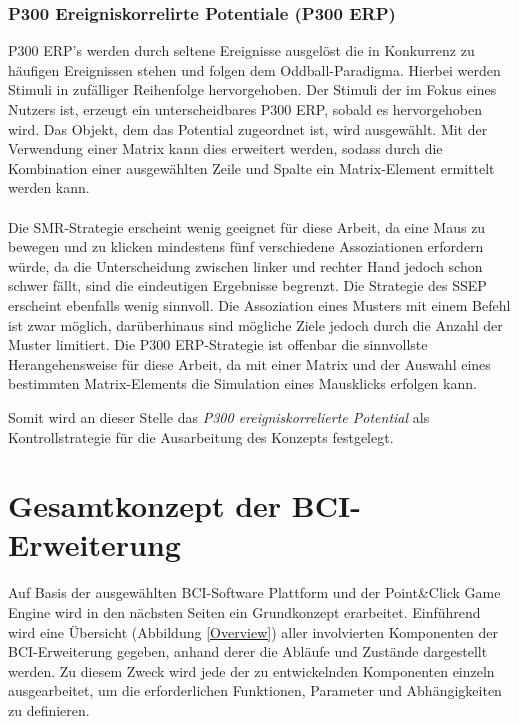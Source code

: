 \subsubsection{P300 Ereigniskorrelirte Potentiale (\acs{P300 ERP})}
\acs{P300 ERP}'s werden durch seltene Ereignisse ausgelöst die in Konkurrenz zu häufigen Ereignissen stehen und folgen dem Oddball-Paradigma.
Hierbei werden Stimuli in zufälliger Reihenfolge hervorgehoben. 
Der Stimuli der im Fokus eines Nutzers ist, erzeugt ein unterscheidbares \acs{P300 ERP}, sobald es hervorgehoben wird.
Das Objekt, dem das Potential zugeordnet ist, wird ausgewählt.
Mit der Verwendung einer Matrix \cite{FarwellDonchin1988} kann dies erweitert werden, sodass durch die Kombination einer ausgewählten Zeile und Spalte ein Matrix-Element ermittelt werden kann.\\ \\





Die \acs{SMR}-Strategie erscheint wenig geeignet für diese Arbeit, da eine Maus zu bewegen und zu klicken mindestens fünf verschiedene Assoziationen erfordern würde,
da die Unterscheidung zwischen linker und rechter Hand jedoch schon schwer fällt, sind die eindeutigen Ergebnisse begrenzt.
Die Strategie des \acs{SSEP} erscheint ebenfalls wenig sinnvoll. Die Assoziation eines Musters mit einem Befehl ist zwar möglich, 
darüberhinaus sind mögliche Ziele jedoch durch die Anzahl der Muster limitiert.
Die \acs{P300 ERP}-Strategie ist offenbar die sinnvollste Herangehensweise für diese Arbeit, 
da mit einer Matrix und der Auswahl eines bestimmten Matrix-Elements die Simulation eines Mausklicks erfolgen kann.

Somit wird an dieser Stelle das \textit{P300 ereigniskorrelierte Potential} als Kontrollstrategie für die Ausarbeitung des Konzepts festgelegt.\\













\pagebreak
\section{Gesamtkonzept der BCI-Erweiterung}

Auf Basis der ausgewählten BCI-Software Plattform und der Point\&Click Game Engine wird in den nächsten Seiten ein Grundkonzept erarbeitet.
Einführend wird eine Übersicht (Abbildung \ref{Overview}) aller involvierten Komponenten der BCI-Erweiterung gegeben, anhand derer die Abläufe und Zustände dargestellt werden.
Zu diesem Zweck wird jede der zu entwickelnden Komponenten einzeln ausgearbeitet, um die erforderlichen Funktionen, Parameter und Abhängigkeiten zu definieren.\\

